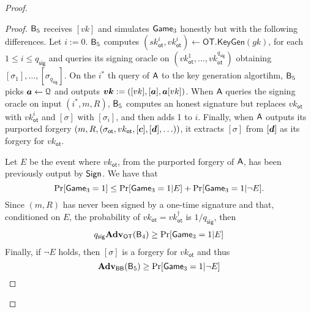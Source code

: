 \begin{proof}
\begin{proof}
$\mathsf{B}_5$ receives $[vk]$ and simulates $\mathsf{Game}_3$ honestly but with the following differences. Let $i:=0$. $\mathsf{B}_5$ computes $(sk_\mathsf{ot}^i,vk_\mathsf{ot}^i)\gets\mathsf{OT}.\mathsf{KeyGen}(gk)$, for each $1\leq i\leq q_\mathsf{sig}$ and queries its signing oracle on $(vk_{\mathsf{ot}}^1,\ldots,vk_\mathsf{ot}^{q_{\mathsf{sig}}})$ obtaining $[\sigma_1],\ldots,[\sigma_{q_\mathsf{sig}}]$. On the $i^*$ th query of $\mathsf{A}$ to the key generation algortihm, $\mathsf{B}_5$ picks ${\boldsymbol{a}}\gets\mathcal{Q}$ and outputs ${\boldsymbol{vk}}:=([vk],[{\boldsymbol{a}}],{\boldsymbol{a}}[vk])$. When $\mathsf{A}$ queries the signing oracle on input $(i^*,m,R)$, $\mathsf{B}_5$ computes an honest signature but replaces $vk_\mathsf{ot}$ with $vk_\mathsf{ot}^i$ and $[\sigma]$ with $[\sigma_i]$, and then adds 1 to $i$. Finally, when $\mathsf{A}$ outputs its purported forgery $(m,R,(\sigma_\mathsf{ot},vk_\mathsf{ot},[{\boldsymbol{c}}],[{\boldsymbol{d}}],\ldots))$, it extracts $[\sigma]$ from $[{\boldsymbol{d}}]$ as its forgery for $vk_\mathsf{ot}$.

Let $E$ be the event where $vk_\mathsf{ot}$, from the purported forgery of $\mathsf{A}$, has been previously output by $\mathsf{Sign}$. We have that
$$
\Pr[\mathsf{Game}_3=1]\leq \Pr[\mathsf{Game}_3=1|E]+\Pr[\mathsf{Game}_3=1|\neg E].
$$
Since  $(m,R)$ has never been signed by a one-time signature and that, conditioned on $E$, the probability of $vk_\mathsf{ot}=vk_\mathsf{ot}^\dag$ is $1/q_\mathsf{sig}$, then
\begin{align*}
q_{\mathsf{sig}}\mathbf{Adv}_\mathsf{OT}(\mathsf{B}_4)\geq  \Pr[\mathsf{Game}_3=1|E]
\end{align*}
Finally, if $\neg E$ holds, then $[\sigma]$ is a forgery for $vk_\mathsf{ot}$ and thus
$$
\mathbf{Adv}_{\mathsf{BB}}(\mathsf{B}_5)\geq \Pr[\mathsf{Game}_3=1|\neg E]$$
\end{proof}
\end{proof}

